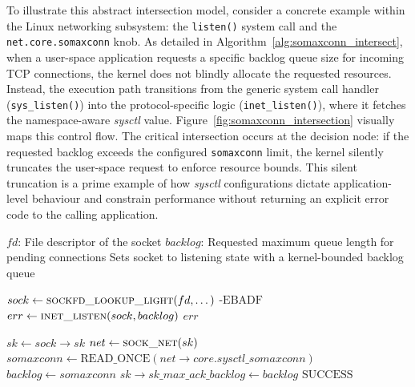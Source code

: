 To illustrate this abstract intersection model, consider a concrete example within the Linux networking subsystem: the \texttt{listen()} system call and the \texttt{net.core.somaxconn} knob.
As detailed in Algorithm~\ref{alg:somaxconn_intersect}, when a user-space application requests a specific backlog queue size for incoming TCP connections, the kernel does not blindly allocate the requested resources.
Instead, the execution path transitions from the generic system call handler (\texttt{sys\_listen()}) into the protocol-specific logic (\texttt{inet\_listen()}), where it fetches the namespace-aware \textit{sysctl} value. Figure~\ref{fig:somaxconn_intersection} visually maps this control flow.
The critical intersection occurs at the decision node: if the requested backlog exceeds the configured \texttt{somaxconn} limit, the kernel silently truncates the user-space request to enforce resource bounds.
This silent truncation is a prime example of how \textit{sysctl} configurations dictate application-level behaviour and constrain performance without returning an explicit error code to the calling application.

\begin{algorithm}[H]
\caption{Intersection of \texttt{listen()} System Call and \texttt{net.core.somaxconn}}
\label{alg:somaxconn_intersect}
\begin{algorithmic}[1]

\Require $fd$: File descriptor of the socket
\Require $backlog$: Requested maximum queue length for pending connections
\Ensure Sets socket to listening state with a kernel-bounded backlog queue

\Statex
{} 
    \State $sock \gets \Call{sockfd\_lookup\_light}{fd, \dots}$
        \State \Return $\text{-EBADF}$
    \EndIf
    \Statex
    \State $err \gets \Call{inet\_listen}{sock, backlog}$ 
    \State {}
    \State \Return $err$
\EndFunction

\Statex
{} 
    \State $sk \gets sock\rightarrow sk$
    \State $net \gets \Call{sock\_net}{sk}$ 
    \Statex
    \State {}
    \State $somaxconn \gets \text{READ\_ONCE}(net\rightarrow core.sysctl\_somaxconn)$
    \Statex
     
        \State $backlog \gets somaxconn$ 
    \EndIf
    \Statex
    \State $sk\rightarrow sk\_max\_ack\_backlog \gets backlog$ 
    \State {}
    \State \Return $\text{SUCCESS}$
\EndFunction

\end{algorithmic}
\end{algorithm}

